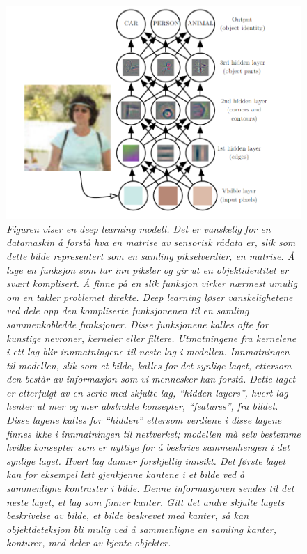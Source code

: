 \begin{figure} 
\begin{center} 
\includegraphics[scale=0.7]{figures/deep}
\caption{\small \sl Figuren viser en deep learning modell. Det er vanskelig for en datamaskin å forstå hva en matrise av sensorisk rådata er, slik som dette bilde representert som en samling pikselverdier, en matrise. Å lage en funksjon som tar inn piksler og gir ut en objektidentitet er svært komplisert. Å finne på en slik funksjon virker nærmest umulig om en takler problemet direkte. Deep learning løser vanskelighetene ved dele opp den kompliserte funksjonenen til en samling sammenkobledde funksjoner. Disse funksjonene kalles ofte for kunstige nevroner, kerneler eller filtere. Utmatningene fra kernelene i ett lag blir innmatningene til neste lag i modellen. Innmatningen til modellen, slik som et bilde, kalles for det synlige laget, ettersom den består av informasjon som vi mennesker kan forstå. Dette laget er etterfulgt av en serie med skjulte lag, ``hidden layers'', hvert lag henter ut mer og mer abstrakte konsepter, ``features'', fra bildet. Disse lagene kalles for ``hidden'' ettersom verdiene i disse lagene finnes ikke i innmatningen til nettverket; modellen må selv bestemme hvilke konsepter som er nyttige for å beskrive sammenhengen i det synlige laget. Hvert lag danner forskjellig innsikt. Det første laget kan for eksempel lett gjenkjenne kantene i et bilde ved å sammenligne kontraster i bilde. Denne informasjonen sendes til det neste laget, et lag som finner kanter. Gitt det andre skjulte lagets beskrivelse av bilde, et bilde beskrevet med kanter, så kan objektdeteksjon bli mulig ved å sammenligne en samling kanter, konturer, med deler av kjente objekter. \cite{Goodfellow m.fl. 2016 s. 6} \label{fig:deep}} 
\end{center} 
\end{figure} 

